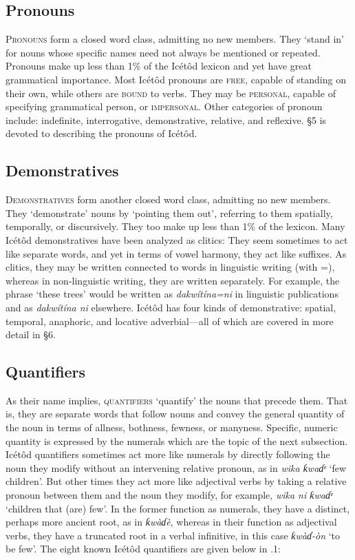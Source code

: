 \subsection{Pronouns}


\textsc{Pronouns} form a closed word class, admitting no new members. They ‘stand in’ for nouns whose specific names need not always be mentioned or repeated. Pronouns make up less than 1\% of the Icétôd lexicon and yet have great grammatical importance. Most Icétôd pronouns are \textsc{free}, capable of standing on their own, while others are \textsc{bound} to verbs. They may be \textsc{personal}, capable of specifying grammatical person, or \textsc{impersonal}. Other categories of pronoun include: indefinite, interrogative, demonstrative, relative, and reflexive. §5 is devoted to describing the pronouns of Icétôd.
 
\subsection{Demonstratives}


\textsc{Demonstratives} form another closed word class, admitting no new members. They ‘demonstrate’ nouns by ‘pointing them out’, referring to them spatially, temporally, or discursively. They too make up less than 1\% of the lexicon. Many Icétôd demonstratives have been analyzed as clitics: They seem sometimes to act like separate words, and yet in terms of vowel harmony, they act like suffixes. As clitics, they may be written connected to words in linguistic writing (with =), whereas in non-linguistic writing, they are written separately. For example, the phrase ‘these trees’ would be written as \textit{dakwítína=ni} in linguistic publications and as \textit{dakwítína ni} elsewhere. Icétôd has four kinds of demonstrative: spatial, temporal, anaphoric, and locative adverbial—all of which are covered in more detail in §6.
 
\subsection{Quantifiers}


As their name implies, \textsc{quantifiers} ‘quantify’ the nouns that precede them. That is, they are separate words that follow nouns and convey the general quantity of the noun in terms of allness, bothness, fewness, or manyness. Specific, numeric quantity is expressed by the numerals which are the topic of the next subsection. Icétôd quantifiers sometimes act more like numerals by directly following the noun they modify without an intervening relative pronoun, as in \textit{wika ƙwaɗᵉ} ‘few children’. But other times they act more like adjectival verbs by taking a relative pronoun between them and the noun they modify, for example, \textit{wika ni ƙwaɗᵉ} ‘children that (are) few’. In the former function as numerals, they have a distinct, perhaps more ancient root, as in \textit{ƙwàɗè}, whereas in their function as adjectival verbs, they have a truncated root in a verbal infinitive, in this case \textit{ƙwàɗ-òn} ‘to be few’. The eight known Icétôd quantifiers are given below in .1:


